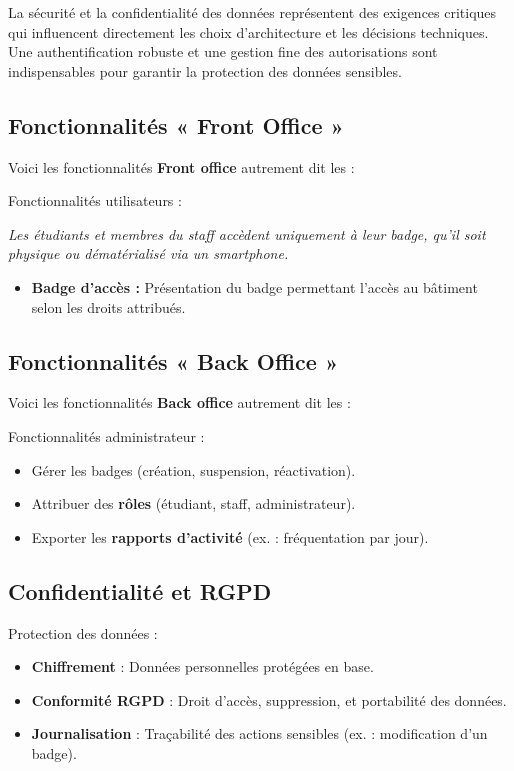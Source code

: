 La sécurité et la confidentialité des données représentent des exigences critiques qui influencent directement les choix d’architecture et les décisions techniques.  
Une authentification robuste et une gestion fine des autorisations sont indispensables pour garantir la protection des données sensibles.

\subsection{Fonctionnalités « Front Office »}
Voici les fonctionnalités \textbf{Front office} autrement dit les :
\newline

\begin{for_you}{Fonctionnalités utilisateurs :}

    \textit{
    Les étudiants et membres du staff accèdent uniquement à leur badge, qu’il soit physique ou dématérialisé via un smartphone.  
    }

    \begin{itemize}
        \item \textbf{Badge d’accès :} Présentation du badge permettant l’accès au bâtiment selon les droits attribués.
    \end{itemize}

\end{for_you}

\subsection{Fonctionnalités « Back Office »}
Voici les fonctionnalités \textbf{Back office} autrement dit les :
\newline

\begin{for_you}{Fonctionnalités administrateur :}
    \begin{itemize}
        \item Gérer les badges (création, suspension, réactivation).
        \item Attribuer des \textbf{rôles} (étudiant, staff, administrateur).
        \item Exporter les \textbf{rapports d’activité} (ex. : fréquentation par jour).
    \end{itemize}
\end{for_you}

\subsection{Confidentialité et RGPD}
\begin{for_you}{Protection des données :}
    \begin{itemize}
        \item \textbf{Chiffrement} : Données personnelles protégées en base.
        \item \textbf{Conformité RGPD} : Droit d’accès, suppression, et portabilité des données.
        \item \textbf{Journalisation} : Traçabilité des actions sensibles (ex. : modification d’un badge).
    \end{itemize}
\end{for_you}

